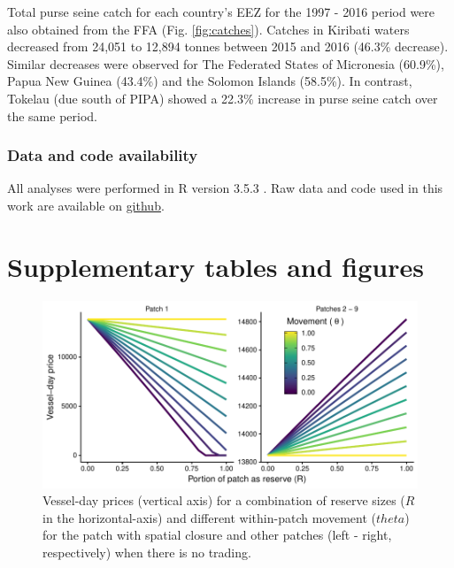 \documentclass[12pt]{article}
\begin{document}
Total purse seine catch for each country's EEZ for the 1997 - 2016 period were also obtained from the FFA (Fig. \ref{fig:catches}). Catches in Kiribati waters decreased from 24,051 to 12,894 tonnes between 2015 and 2016 (46.3\% decrease). Similar decreases were observed for The Federated States of Micronesia (60.9\%), Papua New Guinea (43.4\%) and the Solomon Islands (58.5\%). In contrast, Tokelau (due south of PIPA) showed a 22.3\% increase in purse seine catch over the same period.

\subsubsection{Data and code availability}

All analyses were performed in R version 3.5.3 \cite{rcore_2018}. Raw data and code used in this work are available on \href{https://github.com/jcvdav/MPA_displacement}{github}.

\clearpage

\FloatBarrier

\section{Supplementary tables and figures}

\begin{figure}[htbp]
\centering
\includegraphics{img/vessel_day_price_no_trading_plot.pdf}
\caption{\label{fig:vessel_day_price_no_trading_plot}Vessel-day prices (vertical axis) for a combination of reserve sizes ($R$ in the horizontal-axis) and different within-patch movement ($theta$) for the patch with spatial closure and other patches (left - right, respectively) when there is no trading.}
\end{figure}
\end{document}
